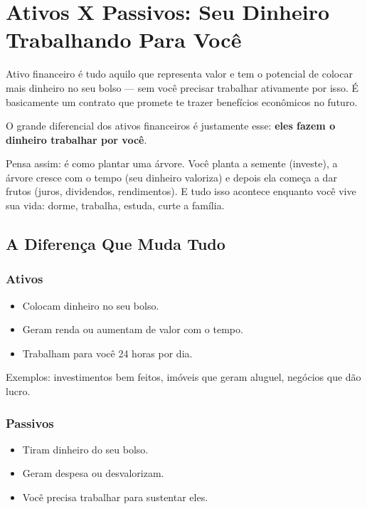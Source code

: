 \chapter{Ativos X Passivos: Seu Dinheiro Trabalhando Para Você}
\hypertarget{cap2}{}
\noindent Ativo financeiro é tudo aquilo que representa valor e tem o potencial de colocar mais dinheiro no seu bolso --- sem você precisar trabalhar ativamente por isso. É basicamente um contrato que promete te trazer benefícios econômicos no futuro.

\vspace{0.5cm}
\noindent O grande diferencial dos ativos financeiros é justamente esse: \textbf{eles fazem o dinheiro trabalhar por você}.

\vspace{0.5cm}
\noindent Pensa assim: é como plantar uma árvore. Você planta a semente (investe), a árvore cresce com o tempo (seu dinheiro valoriza) e depois ela começa a dar frutos (juros, dividendos, rendimentos). E tudo isso acontece enquanto você vive sua vida: dorme, trabalha, estuda, curte a família.

\section{A Diferença Que Muda Tudo}

\subsection{Ativos}
\begin{itemize}[leftmargin=*]
    \item Colocam dinheiro no seu bolso.
    \item Geram renda ou aumentam de valor com o tempo.
    \item Trabalham para você 24 horas por dia.
\end{itemize}

\noindent Exemplos: investimentos bem feitos, imóveis que geram aluguel, negócios que dão lucro.

\subsection{Passivos}
\begin{itemize}[leftmargin=*]
    \item Tiram dinheiro do seu bolso.
    \item Geram despesa ou desvalorizam.
    \item Você precisa trabalhar para sustentar eles.
\end{itemize}

